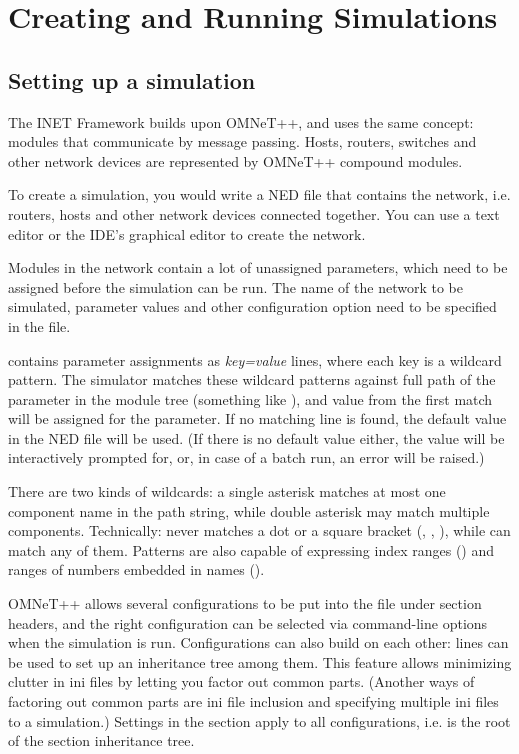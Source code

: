 \section{Creating and Running Simulations}

\subsection{Setting up a simulation}

The INET Framework builds upon OMNeT++, and uses the same concept: modules
that communicate by message passing. Hosts, routers, switches and other
network devices are represented by OMNeT++ compound modules.

To create a simulation, you would write a NED file that contains the network,
i.e. routers, hosts and other network devices connected together. You can
use a text editor or the IDE's graphical editor to create the network.

Modules in the network contain a lot of unassigned parameters, which need
to be assigned before the simulation can be run.
The name of the network to be simulated, parameter values
and other configuration option need to be specified in the 
file.

 contains parameter assignments as \textit{key=value}
lines, where each key is a wildcard pattern. The simulator matches these
wildcard patterns against full path of the parameter in the module tree
(something like ), and value from
the first match will be assigned for the parameter. If no matching line is
found, the default value in the NED file will be used. (If there is no
default value either, the value will be interactively prompted for, or, in
case of a batch run, an error will be raised.)

There are two kinds of wildcards: a single asterisk \ttt{*} matches at most
one component name in the path string, while double asterisk \ttt{**} may
match multiple components. Technically: \ttt{*} never matches a dot or a
square bracket (, \ttt{[}, \ttt{]}), while \ttt{**} can match any of
them. Patterns are also capable of expressing index ranges
() and ranges of numbers embedded
in names ().

OMNeT++ allows several configurations to be put into the 
file under  section headers, and the right
configuration can be selected via command-line options when the simulation
is run. Configurations can also build on each other: 
lines can be used to set up an inheritance tree among them. This feature
allows minimizing clutter in ini files by letting you factor out common
parts. (Another ways of factoring out common parts are ini file inclusion
and specifying multiple ini files to a simulation.) Settings in the
\ttt{[General]} section apply to all configurations, i.e. \ttt{[General]}
is the root of the section inheritance tree.

